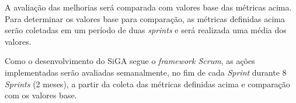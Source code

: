     A avaliação das melhorias será comparada com valores base das métricas acima. Para determinar os valores base para comparação, 
    as métricas definidas acima serão coletadas em um período de duas \textit{sprints} e será realizada uma média dos valores.
    
    Como o desenvolvimento do SiGA segue o \textit{framework Scrum}, as ações implementadas serão avaliadas semanalmente,
    no fim de cada \textit{Sprint} durante 8 \textit{Sprints} (2 meses), a partir da coleta das métricas definidas acima e
    comparação com os valores base.
